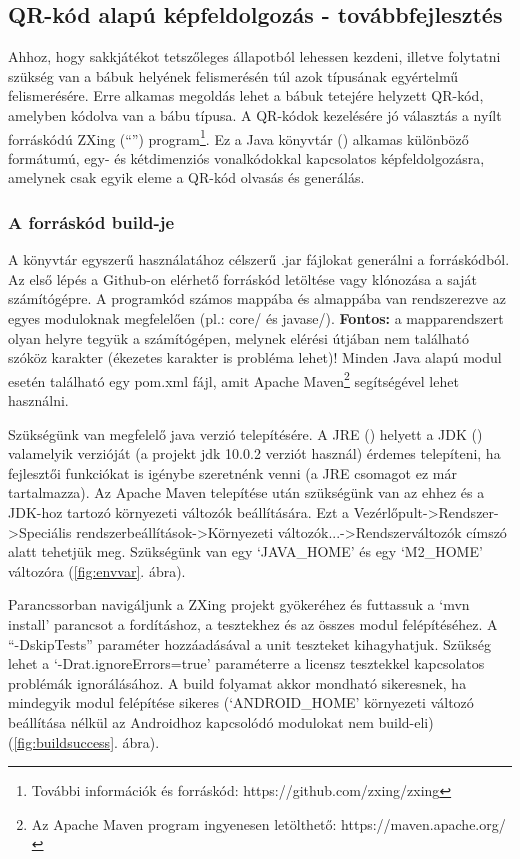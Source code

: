 \documentclass[../documentation.tex]{subfiles}
\begin{document}
\subsection{QR-kód alapú képfeldolgozás - továbbfejlesztés} \label{qrsection}
Ahhoz, hogy sakkjátékot tetszőleges állapotból lehessen kezdeni, illetve folytatni szükség van a bábuk helyének felismerésén túl azok típusának egyértelmű felismerésére. Erre alkamas megoldás lehet a bábuk tetejére helyzett QR-kód, amelyben kódolva van a bábu típusa. A QR-kódok kezelésére jó választás a nyílt forráskódú ZXing (``'') program\footnote{További információk és forráskód: https://github.com/zxing/zxing}. Ez a Java könyvtár () alkamas különböző formátumú, egy- és kétdimenziós vonalkódokkal kapcsolatos képfeldolgozásra, amelynek csak egyik eleme a QR-kód olvasás és generálás.

\subsubsection{A forráskód build-je}
A könyvtár egyszerű használatához célszerű .jar fájlokat generálni a forráskódból. Az első lépés a Github-on elérhető forráskód letöltése vagy klónozása a saját számítógépre. A programkód számos mappába és almappába van rendszerezve az egyes moduloknak megfelelően (pl.: core/ és javase/). \textbf{Fontos:} a mapparendszert olyan helyre tegyük a számítógépen, melynek elérési útjában nem található szóköz karakter (ékezetes karakter is probléma lehet)! Minden Java alapú modul esetén található egy pom.xml fájl, amit Apache Maven\footnote{Az Apache Maven program ingyenesen letölthető: https://maven.apache.org/} segítségével lehet használni.

Szükségünk van megfelelő java verzió telepítésére. A JRE () helyett a JDK () valamelyik verzióját (a projekt jdk 10.0.2 verziót használ) érdemes telepíteni, ha fejlesztői funkciókat is igénybe szeretnénk venni (a JRE csomagot ez már tartalmazza). Az Apache Maven telepítése után szükségünk van az ehhez és a JDK-hoz tartozó környezeti változók beállítására. Ezt a Vezérlőpult->Rendszer->Speciális rendszerbeállítások->Környezeti változók...->Rendszerváltozók címszó alatt tehetjük meg. Szükségünk van egy `JAVA\_HOME' és egy `M2\_HOME' változóra (\ref{fig:envvar}. ábra).

Parancssorban navigáljunk a ZXing projekt gyökeréhez és futtassuk a `mvn install' parancsot a fordításhoz, a tesztekhez és az összes modul felépítéséhez. A ``-DskipTests'' paraméter hozzáadásával a unit teszteket kihagyhatjuk. Szükség lehet a `-Drat.ignoreErrors=true' paraméterre a licensz tesztekkel kapcsolatos problémák ignorálásához. A build folyamat akkor mondható sikeresnek, ha mindegyik modul felépítése sikeres (`ANDROID\_HOME' környezeti változó beállítása nélkül az Androidhoz kapcsolódó modulokat nem build-eli) (\ref{fig:buildsuccess}. ábra).
\end{document}
